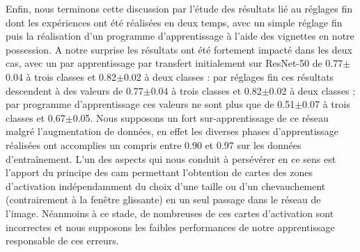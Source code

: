 Enfin, nous terminons cette discussion par l'étude des résultats lié au réglages fin dont les expériences ont été réalisées en deux temps, avec un simple réglage fin puis la réalisation d'un programme d'apprentissage à l'aide des vignettes en notre possession. A notre surprise les résultats ont été fortement impacté dans les deux cas, avec un \fscore par apprentissage par transfert initialement sur ResNet-50 de 0.77$\pm$0.04 à trois classes et 0.82$\pm$0.02 à deux classes : par réglages fin ces résultats descendent à des valeurs de 0.77$\pm$0.04 à trois classes et 0.82$\pm$0.02 à deux classes ; par programme d'apprentissage ces valeurs ne sont plus que de 0.51$\pm$0.07 à trois classes et 0.67$\pm$0.05. Nous supposons un fort sur-apprentissage de ce réseau malgré l'augmentation de données, en effet les diverses phases d'apprentissage réalisées ont accomplies un \fscore compris entre 0.90 et 0.97 sur les données d'entraînement. L'un des aspects qui nous conduit à persévérer en ce sens est l'apport du principe des \gls{cam} permettant l'obtention de cartes des zones d'activation indépendamment du choix d'une taille ou d'un chevauchement (contrairement à la fenêtre glissante) en un seul passage dans le réseau de l'image. Néanmoins à ce stade, de nombreuses de ces cartes d'activation sont incorrectes et nous supposons les faibles performances de notre apprentissage responsable de ces erreurs.\par